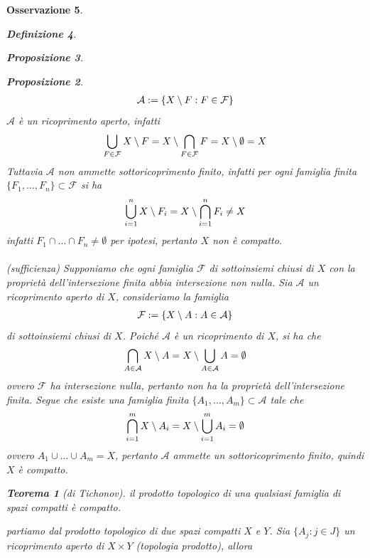 \documentclass[oneside, 11pt]{amsbook}
\makeatletter
\newcommand{\0}{{(0)}}
\newcommand{\3}{{(3)}}
\theoremstyle{colonplain}
\newtheorem{thm}{Teorema}[chapter]
\newtheorem{prop}[thm]{Proposizione}
\theoremstyle{colondefinition}
\newtheorem{defn}[thm]{Definizione}
\theoremstyle{colonremark}
\newtheorem{rmk}[thm]{Osservazione}
\numberwithin{equation}{chapter}
\renewcommand{\proofname}{Dimostrazione}
\renewenvironment{proof}[1][\proofname]{\par
  \pushQED{\end{proof}}%
  \normalfont \topsep6\p@\@plus6\p@\relax
  \trivlist
  \item[\hskip\labelsep\bfseries #1:]\ignorespaces
}{%
  \popQED\endtrivlist\@endpefalse
}
\makeatother
\begin{document}
\begin{rmk}
\begin{defn}
\begin{prop}
\begin{prop}
\begin{proof}
\begin{align}
    \mathcal{A} := \{ X \setminus F : F \in \mathcal{F} \} \notag
\end{align}
$\mathcal{A}$ è un ricoprimento aperto, infatti
\begin{align}
    \bigcup_{F \in \mathcal{F}} X \setminus F = X \setminus \bigcap_{F \in \mathcal{F}} F = X \setminus \emptyset = X \notag
\end{align}
Tuttavia $\mathcal{A}$ non ammette sottoricoprimento finito, infatti per ogni famiglia finita $\{ F_1, \dots, F_n \} \subset \mathcal{F}$ si ha
\begin{align}
    \bigcup_{i = 1}^n X \setminus F_i = X \setminus \bigcap_{i = 1}^n F_i \neq X \notag 
\end{align}
infatti $F_1 \cap \dots \cap F_n \neq \emptyset$ per ipotesi, pertanto $X$ non è compatto. \\ \\
\textit{(sufficienza)} Supponiamo che ogni famiglia $\mathcal{F}$ di sottoinsiemi chiusi di $X$ con la proprietà dell'intersezione finita abbia intersezione non nulla. Sia $\mathcal{A}$ un ricoprimento aperto di $X$, consideriamo la famiglia
\begin{align}
    \mathcal{F} := \{ X \setminus A : A \in \mathcal{A} \} \notag
\end{align}
di sottoinsiemi chiusi di $X$. Poiché $\mathcal{A}$ è un ricoprimento di $X$, si ha che
\begin{align}
    \bigcap_{A \in \mathcal{A}} X \setminus A = X \setminus \bigcup_{A \in \mathcal{A}} A = \emptyset \notag
\end{align}
ovvero $\mathcal{F}$ ha intersezione nulla, pertanto non ha la proprietà dell'intersezione finita. Segue che esiste una famiglia finita $\{ A_1, \dots, A_m \} \subset \mathcal{A}$ tale che
\begin{align}
    \bigcap_{i = 1}^m X \setminus A_i = X \setminus \bigcup_{i = 1}^m A_i = \emptyset \notag
\end{align}
ovvero $A_1 \cup \dots \cup A_m = X$, pertanto $\mathcal{A}$ ammette un sottoricoprimento finito, quindi $X$ è compatto.
\end{proof}
\begin{thm}[di Tichonov]
il prodotto topologico di una qualsiasi famiglia di spazi compatti è compatto.
\end{thm}
\begin{proof}
partiamo dal prodotto topologico di due spazi compatti $X$ e $Y$. Sia $\{ A_j : j \in J \}$ un ricoprimento aperto di $X \times Y$ (topologia prodotto), allora

\end{proof}
\end{prop}
\end{prop}
\end{defn}
\end{rmk}
\end{document}
